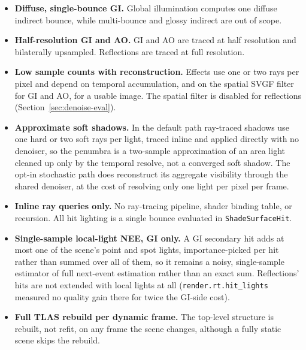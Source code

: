 \begin{itemize}
  \item \textbf{Diffuse, single-bounce GI.} Global illumination computes one diffuse indirect bounce,
    while multi-bounce and glossy indirect are out of scope.
  \item \textbf{Half-resolution GI and AO.} GI and AO are traced at half resolution and bilaterally
    upsampled. Reflections are traced at full resolution.
  \item \textbf{Low sample counts with reconstruction.} Effects use one or two rays per pixel and
    depend on temporal accumulation, and on the spatial SVGF filter for GI and AO, for a usable
    image. The spatial filter is disabled for reflections (Section~\ref{sec:denoise-eval}).
  \item \textbf{Approximate soft shadows.} In the default path ray-traced shadows use one hard or two
    soft rays per light, traced inline and applied directly with no denoiser, so the penumbra is a
    two-sample approximation of an area light cleaned up only by the temporal resolve, not a
    converged soft shadow. The opt-in stochastic path does reconstruct its aggregate visibility
    through the shared denoiser, at the cost of resolving only one light per pixel per frame.
  \item \textbf{Inline ray queries only.} No ray-tracing pipeline, shader binding table, or
    recursion. All hit lighting is a single bounce evaluated in \texttt{ShadeSurfaceHit}.
  \item \textbf{Single-sample local-light NEE, GI only.} A GI secondary hit adds at most one of the
    scene's point and spot lights, importance-picked per hit rather than summed over all of them, so
    it remains a noisy, single-sample estimator of full next-event estimation rather than an exact
    sum. Reflections' hits are not extended with local lights at all (\texttt{render.rt.hit_lights}
    measured no quality gain there for twice the GI-side cost).
  \item \textbf{Full TLAS rebuild per dynamic frame.} The top-level structure is rebuilt, not refit,
    on any frame the scene changes, although a fully static scene skips the rebuild.
\end{itemize}
